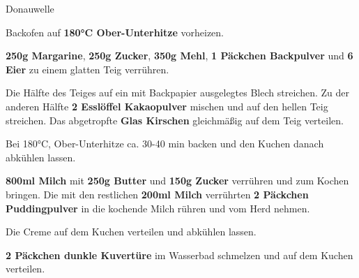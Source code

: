 \begin{recipe}[]{Donauwelle}
	

\step
Backofen auf \textbf{180°C Ober-Unterhitze} vorheizen.

\step
\textbf{250g Margarine}, \textbf{250g Zucker}, \textbf{350g Mehl}, \textbf{1 Päckchen Backpulver} und \textbf{6 Eier} zu einem glatten Teig verrühren.

\step
Die Hälfte des Teiges auf ein mit Backpapier ausgelegtes Blech streichen. Zu der anderen Hälfte \textbf{2 Esslöffel Kakaopulver} mischen und auf den hellen Teig streichen. Das abgetropfte \textbf{Glas Kirschen} gleichmäßig auf dem Teig verteilen.

\step
Bei 180°C, Ober-Unterhitze ca. 30-40 min backen und den Kuchen danach abkühlen lassen.

\step
\textbf{800ml Milch} mit \textbf{250g Butter} und \textbf{150g Zucker} verrühren und zum Kochen bringen. Die mit den restlichen \textbf{200ml Milch} verrührten \textbf{2 Päckchen Puddingpulver} in die kochende Milch rühren und vom Herd nehmen.

\step
Die Creme auf dem Kuchen verteilen und abkühlen lassen.

\step
\textbf{2 Päckchen dunkle Kuvertüre} im Wasserbad schmelzen und auf dem Kuchen verteilen.




\end{recipe}